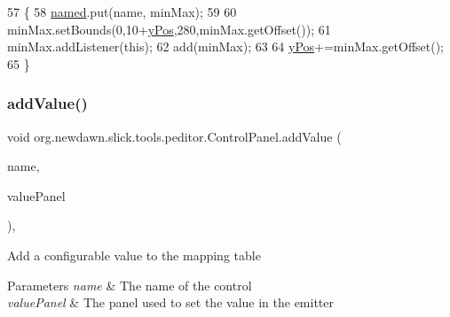 \begin{DoxyCode}
57                                                               \{
58         \mbox{\hyperlink{classorg_1_1newdawn_1_1slick_1_1tools_1_1peditor_1_1_control_panel_a27108a3c115a462302ebfa67d895bcaa}{named}}.put(name, minMax);
59         
60         minMax.setBounds(0,10+\mbox{\hyperlink{classorg_1_1newdawn_1_1slick_1_1tools_1_1peditor_1_1_control_panel_a3d5996be7856b645ae7a1288ce688623}{yPos}},280,minMax.getOffset());
61         minMax.addListener(\textcolor{keyword}{this});
62         add(minMax);
63         
64         \mbox{\hyperlink{classorg_1_1newdawn_1_1slick_1_1tools_1_1peditor_1_1_control_panel_a3d5996be7856b645ae7a1288ce688623}{yPos}}+=minMax.getOffset();
65     \}
\end{DoxyCode}
\mbox{\label{classorg_1_1newdawn_1_1slick_1_1tools_1_1peditor_1_1_control_panel_af298d1803e4450ed4ffe735500bb7c60}} 
\subsubsection{\texorpdfstring{add\+Value()}{addValue()}}
{\footnotesize\ttfamily void org.\+newdawn.\+slick.\+tools.\+peditor.\+Control\+Panel.\+add\+Value (\begin{DoxyParamCaption}\item[{String}]{name,  }\item[{\mbox{\hyperlink{classorg_1_1newdawn_1_1slick_1_1tools_1_1peditor_1_1_value_panel}{Value\+Panel}}}]{value\+Panel }\end{DoxyParamCaption})\hspace{0.3cm}{\ttfamily [inline]}, {\ttfamily [protected]}}

Add a configurable value to the mapping table


\begin{DoxyParams}{Parameters}
{\em name} & The name of the control \\
\hline
{\em value\+Panel} & The panel used to set the value in the emitter \\
\hline
\end{DoxyParams}

